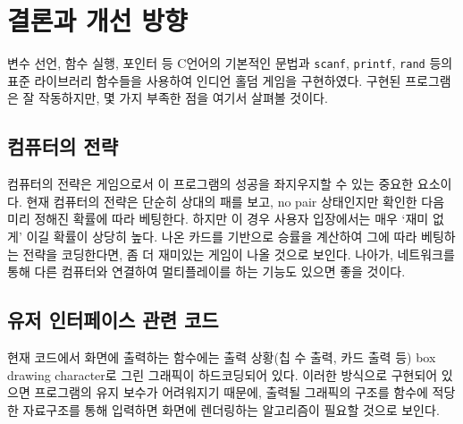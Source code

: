\documentclass[titlepage]{article}
\begin{document}
\section{결론과 개선 방향}

변수 선언, 함수 실행, 포인터 등 C언어의 기본적인 문법과 \texttt{scanf}, \texttt{printf}, \texttt{rand} 등의 표준 라이브러리 함수들을 사용하여 인디언 홀덤 게임을 구현하였다. 구현된 프로그램은 잘 작동하지만, 몇 가지 부족한 점을 여기서 살펴볼 것이다.

\subsection{컴퓨터의 전략}

컴퓨터의 전략은 게임으로서 이 프로그램의 성공을 좌지우지할 수 있는 중요한 요소이다. 현재 컴퓨터의 전략은 단순히 상대의 패를 보고, no pair 상태인지만 확인한 다음 미리 정해진 확률에 따라 베팅한다. 하지만 이 경우 사용자 입장에서는 매우 `재미 없게' 이길 확률이 상당히 높다. 나온 카드를 기반으로 승률을 계산하여 그에 따라 베팅하는 전략을 코딩한다면, 좀 더 재미있는 게임이 나올 것으로 보인다. 나아가, 네트워크를 통해 다른 컴퓨터와 연결하여 멀티플레이를 하는 기능도 있으면 좋을 것이다.

\subsection{유저 인터페이스 관련 코드}

현재 코드에서 화면에 출력하는 함수에는 출력 상황(칩 수 출력, 카드 출력 등) box drawing character로 그린 그래픽이 하드코딩되어 있다. 이러한 방식으로 구현되어 있으면 프로그램의 유지 보수가 어려워지기 때문에, 출력될 그래픽의 구조를 함수에 적당한 자료구조를 통해 입력하면 화면에 렌더링하는 알고리즘이 필요할 것으로 보인다.
\end{document}
